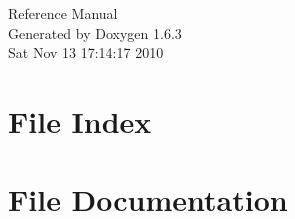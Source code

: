 \documentclass[a4paper]{book}
\begin{document}
\hypersetup{pageanchor=false}
\begin{titlepage}
\vspace*{7cm}
\begin{center}
{\Large Reference Manual}\\
\vspace*{1cm}
{\large Generated by Doxygen 1.6.3}\\
\vspace*{0.5cm}
{\small Sat Nov 13 17:14:17 2010}\\
\end{center}
\end{titlepage}
\clearemptydoublepage
{}
\tableofcontents
\clearemptydoublepage
{}
\hypersetup{pageanchor=true}
\chapter{File Index}

\chapter{File Documentation}


















\printindex
\end{document}
